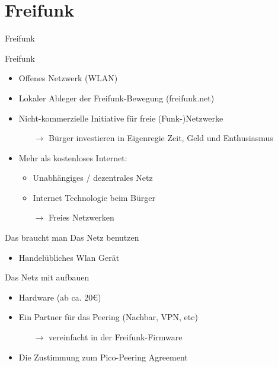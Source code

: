 \section{Freifunk}
\begin{frame}{}
    \begin{center}
        Freifunk
     \end{center}
\end{frame}

\begin{frame}{Freifunk}
    \begin{itemize}
        \item Offenes Netzwerk (WLAN)
        \item Lokaler Ableger der Freifunk-Bewegung (freifunk.net)
        \item Nicht-kommerzielle Initiative für freie (Funk-)Netzwerke
        \begin{itemize}
            \item[$\rightarrow$] Bürger investieren in Eigenregie Zeit, Geld und Enthusiasmus
        \end{itemize}
    \end{itemize}
        \vfill
    \begin{itemize}
        \item Mehr als \glqq{}kostenloses Internet\grqq:
        \begin{itemize}
            \item Unabhängiges / dezentrales Netz
            \item Internet Technologie beim Bürger
            \item[$\rightarrow$] Freies Netzwerken
        \end{itemize}
    \end{itemize}
\end{frame}

\begin{frame}{Das braucht man}
    Das Netz benutzen
    \begin{itemize}
        \item Handelübliches Wlan Gerät
    \end{itemize}

    \vfill

    Das Netz mit aufbauen
    \begin{itemize}
        \item Hardware (ab ca. 20€)
        \item Ein Partner für das Peering (Nachbar, VPN, etc)
        \begin{itemize}
            \item[$\rightarrow$] vereinfacht in der Freifunk-Firmware
        \end{itemize}
        \item Die Zustimmung zum \glqq{}Pico-Peering Agreement\grqq
    \end{itemize}
\end{frame}

